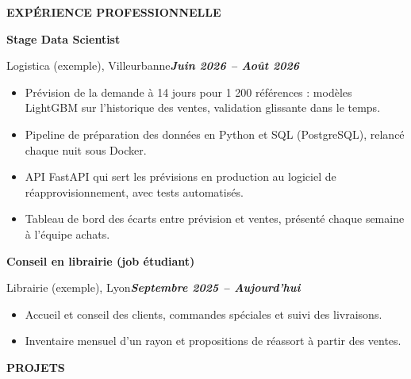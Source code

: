 \documentclass[10pt,a4paper]{article}
\newcommand{\rubrique}[2][12pt plus 2fil]{%
  \par\vspace{#1}%
  {\fontsize{13}{15.5}\selectfont \textbf{\color{cvprimary}#2}\par}%
  \vspace{2pt}{\color{cvprimary}\hrule height 0.4pt}\vspace{7pt}}
\newcommand{\entre}{\par\vspace{7pt plus 1fil}}
\newlength{\hauteurcol}
\begin{document}
\begin{minipage}[t][\hauteurcol][s]{0.55\textwidth}
\raggedright

\rubrique[0pt]{EXPÉRIENCE PROFESSIONNELLE}

{\fontsize{11}{13.5}\selectfont \textbf{Stage Data Scientist}\par}
{\fontsize{11}{13.5}\selectfont Logistica (exemple), Villeurbanne\hfill{\fontsize{10}{12}\selectfont \textbf{\textit{Juin 2026 – Août 2026}}}\par}\vspace{3pt}
\begin{itemize}
    \item Prévision de la demande à 14 jours pour 1 200 références : modèles LightGBM sur l'historique des ventes, validation glissante dans le temps.
    \item Pipeline de préparation des données en Python et SQL (PostgreSQL), relancé chaque nuit sous Docker.
    \item API FastAPI qui sert les prévisions en production au logiciel de réapprovisionnement, avec tests automatisés.
    \item Tableau de bord des écarts entre prévision et ventes, présenté chaque semaine à l'équipe achats.
\end{itemize}

\entre
{\fontsize{11}{13.5}\selectfont \textbf{Conseil en librairie (job étudiant)}\enspace{\fontsize{10}{12}\selectfont \textit{}}\par}
{\fontsize{11}{13.5}\selectfont Librairie (exemple), Lyon\hfill{\fontsize{10}{12}\selectfont \textbf{\textit{Septembre 2025 – Aujourd'hui}}}\par}\vspace{3pt}
\begin{itemize}
    \item Accueil et conseil des clients, commandes spéciales et suivi des livraisons.
    \item Inventaire mensuel d'un rayon et propositions de réassort à partir des ventes.
\end{itemize}


\rubrique{PROJETS}


\end{minipage}
\end{document}
